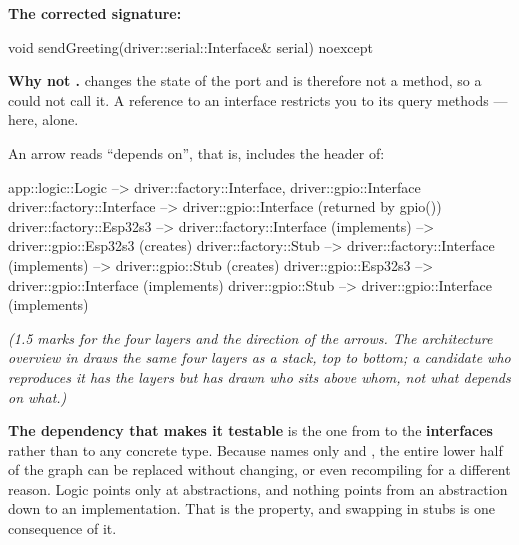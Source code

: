 \textbf{The corrected signature:}

\begin{cppcode}
void sendGreeting(driver::serial::Interface& serial) noexcept
\end{cppcode}

\noindent\textbf{Why not .}  changes the state of the port and is
therefore not a  method, so a  could not call it. A 
reference to an interface restricts you to its query methods --- here,  alone.


An arrow reads ``depends on'', that is, includes the header of:

\begin{console}
app::logic::Logic          --> driver::factory::Interface, driver::gpio::Interface
driver::factory::Interface --> driver::gpio::Interface     (returned by gpio())
driver::factory::Esp32s3   --> driver::factory::Interface  (implements)
                           --> driver::gpio::Esp32s3       (creates)
driver::factory::Stub      --> driver::factory::Interface  (implements)
                           --> driver::gpio::Stub          (creates)
driver::gpio::Esp32s3      --> driver::gpio::Interface     (implements)
driver::gpio::Stub         --> driver::gpio::Interface     (implements)
\end{console}

{\itshape (1.5 marks for the four layers and the direction of the arrows. The architecture overview
in  draws the same four layers as a stack, top to bottom; a candidate who
reproduces it has the layers but has drawn who sits above whom, not what depends on what.)\par}

\medskip
\textbf{The dependency that makes it testable} is the one from  to the
\textbf{interfaces} rather than to any concrete type. Because  names only
 and , the entire lower half of the
graph can be replaced without  changing, or even recompiling for a different reason.
Logic points only at abstractions, and nothing points from an abstraction down to an
implementation. That is the property, and swapping in stubs is one consequence of it.

